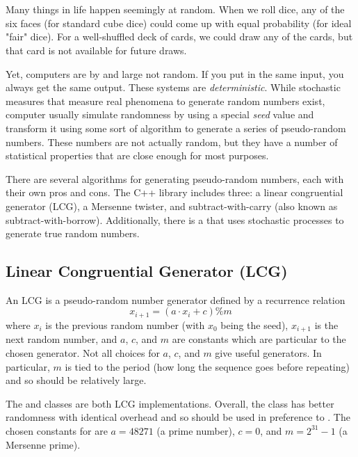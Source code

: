\chapter{}\label{ch:random}

Many things in life happen seemingly at random.
When we roll dice, any of the six faces (for standard cube dice) could come up with equal probability (for ideal "fair" dice).
For a well-shuffled deck of cards, we could draw any of the cards, but that card is not available for future draws.

Yet, computers are by and large not random.
If you put in the same input, you always get the same output.
These systems are \emph{deterministic}.
While stochastic measures that measure real phenomena to generate random numbers exist,
computer usually simulate randomness by using a special \emph{seed} value and transform it using some sort of algorithm to generate a series of pseudo-random numbers.
These numbers are not actually random, but they have a number of statistical properties that are close enough for most purposes.

There are several algorithms for generating pseudo-random numbers, each with their own pros and cons.
The C++  library includes three: a linear congruential generator (LCG), a Mersenne twister, and subtract-with-carry (also known as subtract-with-borrow).
Additionally, there is a  that uses stochastic processes to generate true random numbers.

\section{Linear Congruential Generator (LCG)}\label{sec:random-lcg}

An LCG is a pseudo-random number generator defined by a recurrence relation 
$$x_{i+1} = (a\cdot{x_i} + c) \% m$$
where $x_i$ is the previous random number (with $x_0$ being the seed), $x_{i+1}$ is the next random number, and $a$, $c$, and $m$ are constants which are particular to the chosen generator.
Not all choices for $a$, $c$, and $m$ give useful generators.
In particular, $m$ is tied to the period (how long the sequence goes before repeating) and so should be relatively large.

The  and  classes are both LCG implementations.
Overall, the  class has better randomness with identical overhead and so should be used in preference to .
The chosen constants for  are $a = 48271$ (a prime number), $c = 0$, and $m = 2^{31} - 1$ (a Mersenne prime).

